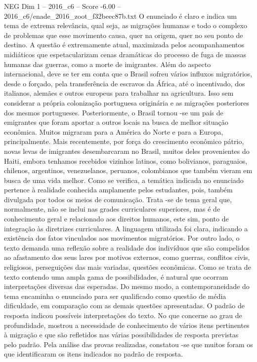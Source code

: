 \begin{textsample}{NEG Dim 1 – 2016\_c6 – Score -6.00 – 2016\_c6/enade\_2016\_zoot\_f32beec87b.txt}
O enunciado é claro e indica um tema de extrema relevância, qual seja, as migrações humanas e todo o complexo de problemas que esse movimento causa, quer na origem, quer no seu ponto de destino.
A questão é extremamente atual, maximizada pelos acompanhamentos midiáticos que espetacularizam cenas dramáticas do processo de fuga de massas humanas das guerras, como a morte de imigrantes.
Além do aspecto internacional, deve se ter em conta que o Brasil sofreu vários influxos migratórios, desde o forçado, pela transferência de escravos da África, até o incentivado, dos italianos, alemães e outros europeus para trabalhar na agricultura.
Isso sem considerar a própria colonização portuguesa originária e as migrações posteriores dos mesmos portugueses.
Posteriormente, o Brasil tornou -se um país de emigrantes que foram aportar a outros locais na busca de melhor situação econômica.
Muitos migraram para a América do Norte e para a Europa, principalmente.
Mais recentemente, por força do crescimento econômico pátrio, novas levas de imigrantes desembarcaram no Brasil, muitos deles provenientes do Haiti, embora tenhamos recebidos vizinhos latinos, como bolivianos, paraguaios, chilenos, argentinos, venezuelanos, peruanos, colombianos que também vieram em busca de uma vida melhor.
Como se verifica, a temática indicada no enunciado pertence à realidade conhecida amplamente pelos estudantes, pois, também divulgada por todos os meios de comunicação.
Trata -se de tema geral que, normalmente, não se inclui nas grades curriculares superiores, mas é de conhecimento geral e relacionado aos direitos humanos, este sim, ponto de integração às diretrizes curriculares.
A linguagem utilizada foi clara, indicando a existência dos fatos vinculados aos movimentos migratórios.
Por outro lado, o texto demanda uma reflexão sobre a realidade dos indivíduos que são compelidos ao afastamento dos seus lares por motivos externos, como guerras, conflitos civis, religiosos, perseguições das mais variadas, questões econômicas.
Como se trata de texto contendo uma ampla gama de possibilidades, é natural que ocorram interpretações diversas das esperadas.
Do mesmo modo, a contemporaneidade do tema encaminha o enunciado para ser qualificado como questão de média dificuldade, em comparação com as demais questões apresentadas.
O padrão de resposta indicou possíveis interpretações do texto.
No que concerne ao grau de profundidade, mostrou a necessidade de conhecimento de vários itens pertinentes à migração e que são refletidos nas várias possibilidades de resposta previstas pelo padrão.
Pela análise das provas realizadas, constatou -se que muitos foram os que identificaram os itens indicados no padrão de resposta.

\end{textsample}
